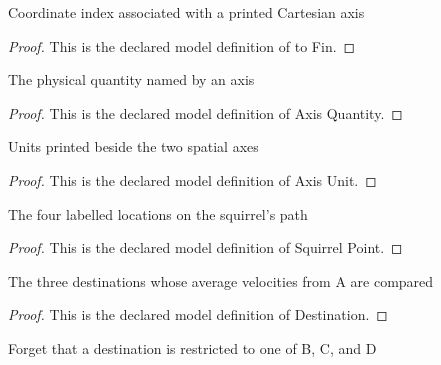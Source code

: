 \begin{definition}[to Fin]
  \label{def:physics:phyx-mini-0737:phyxminiproblems-problemphyxmini0737-diagramaxis-tofin}
  Coordinate index associated with a printed Cartesian axis
\end{definition}
\begin{proof}
  This is the declared model definition of to Fin.
\end{proof}
\begin{definition}
  \label{def:physics:phyx-mini-0737:phyxminiproblems-problemphyxmini0737-axisquantity}
  The physical quantity named by an axis
\end{definition}
\begin{proof}
  This is the declared model definition of Axis Quantity.
\end{proof}
\begin{definition}
  \label{def:physics:phyx-mini-0737:phyxminiproblems-problemphyxmini0737-axisunit}
  Units printed beside the two spatial axes
\end{definition}
\begin{proof}
  This is the declared model definition of Axis Unit.
\end{proof}
\begin{definition}
  \label{def:physics:phyx-mini-0737:phyxminiproblems-problemphyxmini0737-squirrelpoint}
  The four labelled locations on the squirrel's path
\end{definition}
\begin{proof}
  This is the declared model definition of Squirrel Point.
\end{proof}
\begin{definition}[Destination]
  \label{def:physics:phyx-mini-0737:phyxminiproblems-problemphyxmini0737-destination}
  The three destinations whose average velocities from A are compared
\end{definition}
\begin{proof}
  This is the declared model definition of Destination.
\end{proof}
\begin{definition}
  \label{def:physics:phyx-mini-0737:phyxminiproblems-problemphyxmini0737-destination-tosquirrelpoint}
  Forget that a destination is restricted to one of B, C, and D
\end{definition}
